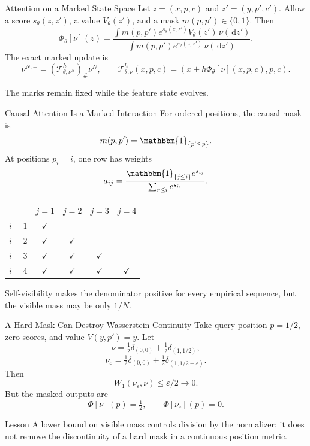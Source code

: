 \documentclass[aspectratio=169,11pt]{beamer}
\newcommand{\dd}{\,\mathrm{d}}
\newcommand{\one}{\mathbbm{1}}
\begin{document}
\begin{frame}{Attention on a Marked State Space}
Let $z=(x,p,c)$ and $z'=(y,p',c')$.  Allow a score $s_\theta(z,z')$, a value $V_\theta(z')$, and a mask $m(p,p')\in\{0,1\}$.  Then
\[
 \Phi_\theta[\nu](z)
 =\frac{\int m(p,p')e^{s_\theta(z,z')}V_\theta(z')\,\nu(\dd z')}
        {\int m(p,p')e^{s_\theta(z,z')}\,\nu(\dd z')}.
\]
The exact marked update is
\[
 \nu^{N,+}=(\mathcal T_{\theta,\nu^N}^h)_\#\nu^N,
 \qquad
 \mathcal T_{\theta,\nu}^h(x,p,c)
 =(x+h\Phi_\theta[\nu](x,p,c),p,c).
\]

The marks remain fixed while the feature state evolves.
\end{frame}

\begin{frame}{Causal Attention Is a Marked Interaction}
For ordered positions, the causal mask is
\[
 m(p,p')=\one_{\{p'\le p\}}.
\]
At positions $p_i=i$, one row has weights
\[
 a_{ij}
 =\frac{\one_{\{j\le i\}}e^{s_{ij}}}
        {\sum_{r\le i}e^{s_{ir}}}.
\]

\begin{center}
\begin{tabular}{c|cccc}
 & $j=1$ & $j=2$ & $j=3$ & $j=4$\\
\hline
$i=1$ & $\checkmark$ & & &\\
$i=2$ & $\checkmark$ & $\checkmark$ & &\\
$i=3$ & $\checkmark$ & $\checkmark$ & $\checkmark$ &\\
$i=4$ & $\checkmark$ & $\checkmark$ & $\checkmark$ & $\checkmark$
\end{tabular}
\end{center}

Self-visibility makes the denominator positive for every empirical sequence, but the visible mass may be only $1/N$.
\end{frame}

\begin{frame}{A Hard Mask Can Destroy Wasserstein Continuity}
Take query position $p=1/2$, zero scores, and value $V(y,p')=y$.  Let
\[
 \nu=\tfrac12\delta_{(0,0)}+\tfrac12\delta_{(1,1/2)},
\]
\[
 \nu_\varepsilon
 =\tfrac12\delta_{(0,0)}+\tfrac12\delta_{(1,1/2+\varepsilon)}.
\]
Then
\[
 W_1(\nu_\varepsilon,\nu)\le\varepsilon/2\longrightarrow0.
\]
But the masked outputs are
\[
 \Phi[\nu](p)=\tfrac12,
 \qquad
 \Phi[\nu_\varepsilon](p)=0.
\]

\begin{alertblock}{Lesson}
A lower bound on visible mass controls division by the normalizer; it does not remove the discontinuity of a hard mask in a continuous position metric.
\end{alertblock}
\end{frame}
\end{document}
